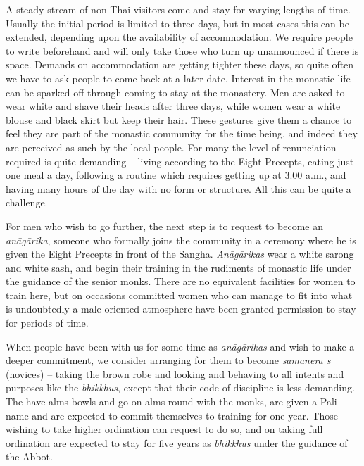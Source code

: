 A steady stream of non-Thai visitors come and stay for varying lengths
of time. Usually the initial period is limited to three days, but in
most cases this can be extended, depending upon the availability of
accommodation. We require people to write beforehand and will only take
those who turn up unannounced if there is space. Demands on
accommodation are getting tighter these days, so quite often we have to
ask people to come back at a later date. Interest in the monastic life
can be sparked off through coming to stay at the monastery. Men are
asked to wear white and shave their heads after three days, while women
wear a white blouse and black skirt but keep their hair. These gestures
give them a chance to feel they are part of the monastic community for
the time being, and indeed they are perceived as such by the local
people. For many the level of renunciation required is quite demanding
-- living according to the Eight Precepts, eating just one meal a day,
following a routine which requires getting up at 3.00 a.m., and having
many hours of the day with no form or structure. All this can be quite a
challenge.

For men who wish to go further, the next step is to request to become an
\emph{anāgārika}, someone who formally joins the community in a ceremony
where he is given the Eight Precepts in front of the Sangha.
\emph{Anāgārikas} wear a white sarong and white sash, and begin their
training in the rudiments of monastic life under the guidance of the
senior monks. There are no equivalent facilities for women to train
here, but on occasions committed women who can manage to fit into what
is undoubtedly a male-oriented atmosphere have been granted permission
to stay for periods of time.

When people have been with us for some time as \emph{anāgārikas} and
wish to make a deeper commitment, we consider arranging for them to
become \emph{sāmanera s} (novices) -- taking the brown robe and looking
and behaving to all intents and purposes like the \emph{bhikkhus},
except that their code of discipline is less demanding. The have
alms-bowls and go on alms-round with the monks, are given a Pali name
and are expected to commit themselves to training for one year. Those
wishing to take higher ordination can request to do so, and on taking
full ordination are expected to stay for five years as \emph{bhikkhus}
under the guidance of the Abbot.

